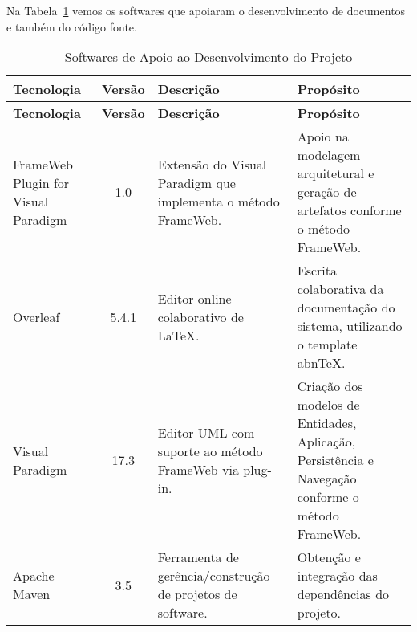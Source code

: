 
Na Tabela~\ref{tabela-software} vemos os softwares que apoiaram o desenvolvimento de documentos e também do código fonte.

\begin{footnotesize}
\begin{longtable}{|p{2.5cm}|c|p{5cm}|p{5.5cm}|}
	\caption{Softwares de Apoio ao Desenvolvimento do Projeto}	
	\label{tabela-software}\\\hline
	
	\rowcolor{lightgray}
	\textbf{Tecnologia} & \textbf{Versão} & \textbf{Descrição} & \textbf{Propósito} \\\hline 
	\endfirsthead
	\hline
	\rowcolor{lightgray}
	\textbf{Tecnologia} & \textbf{Versão} & \textbf{Descrição} & \textbf{Propósito} \\\hline 
	\endhead
	 
	FrameWeb Plugin for Visual Paradigm & 1.0 & Extensão do Visual Paradigm que implementa o método FrameWeb. & Apoio na modelagem arquitetural e geração de artefatos conforme o método FrameWeb. \\\hline

	Overleaf  & 5.4.1 & Editor online colaborativo de LaTeX. & Escrita colaborativa da documentação do sistema, utilizando o template abnTeX. \\\hline        

	Visual Paradigm & 17.3 & Editor UML com suporte ao método FrameWeb via plug-in. & Criação dos modelos de Entidades, Aplicação, Persistência e Navegação conforme o método FrameWeb. \\\hline 
	
	Apache Maven & 3.5 & Ferramenta de gerência/construção de projetos de software. & Obtenção e integração das dependências do projeto. \\\hline
\end{longtable}
\end{footnotesize}
